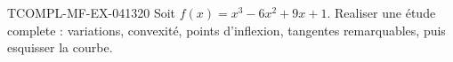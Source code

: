 \begin{exercice}{TCOMPL-MF-EX-041}{3}{20}
Soit $f(x) = x^3 - 6x^2 + 9x + 1$. Realiser une étude complete : variations, convexité, points d'inflexion, tangentes remarquables, puis esquisser la courbe.

\end{exercice}
